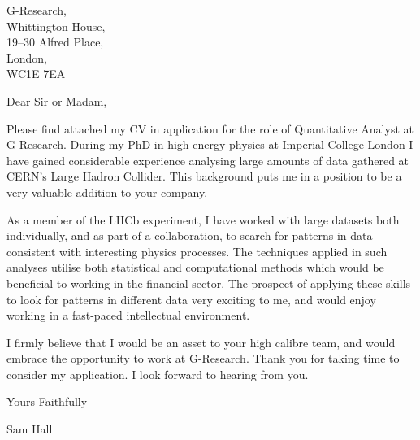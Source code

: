\begin{minipage}{0.5\textwidth}
G-Research,\\
Whittington House,\\
19--30 Alfred Place,\\
London,\\
WC1E 7EA\\
\vspace{3em}
\end{minipage}


Dear Sir or Madam,

Please find attached my CV in application for the role of Quantitative Analyst at G-Research.
During my PhD in high energy physics at Imperial College London I have gained considerable
experience analysing large amounts of data gathered at CERN's Large Hadron Collider.
This background puts me in a position to be a very valuable addition to your company.


As a member of the LHCb experiment,
I have worked with large datasets both individually, and as part of a collaboration, to search for
patterns in data consistent with interesting physics processes.
The techniques applied in such analyses utilise both statistical and computational methods which
would be beneficial to working in the financial sector.
The prospect of applying these skills to look for patterns in different data very exciting to me,
and would enjoy working in a fast-paced intellectual environment.

I firmly believe that I would be an asset to your high calibre team, and would embrace the
opportunity to work at G-Research.
Thank you for taking time to consider my application.
I look forward to hearing from you.

Yours Faithfully


Sam Hall


